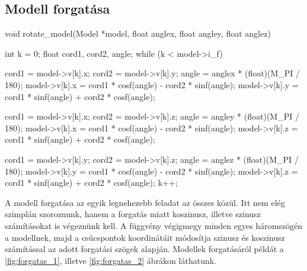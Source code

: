 	



\newpage
\subsection{Modell forgatása}

\begin{cpp}
void rotate_model(Model *model, float anglex, float angley, float anglez)
{
    int k = 0;
    float cord1, cord2, angle;
    while (k < model->i_f)
    {
        cord1 = model->v[k].x;
        cord2 = model->v[k].y;
        angle = anglex * (float)(M_PI / 180);
        model->v[k].x = cord1 * cosf(angle) - cord2 * sinf(angle);
        model->v[k].y = cord1 * sinf(angle) + cord2 * cosf(angle);
			
        cord1 = model->v[k].x;
        cord2 = model->v[k].z;
        angle = angley * (float)(M_PI / 180);
        model->v[k].x = cord1 * cosf(angle) - cord2 * sinf(angle);
        model->v[k].z = cord1 * sinf(angle) + cord2 * cosf(angle);
			
        cord1 = model->v[k].y;
        cord2 = model->v[k].z;
        angle = anglez * (float)(M_PI / 180);
        model->v[k].y = cord1 * cosf(angle) - cord2 * sinf(angle);
        model->v[k].z = cord1 * sinf(angle) + cord2 * cosf(angle);
        k++;
    }
}
\end{cpp}

A modell forgatása az egyik legnehezebb feladat az összes közül. Itt nem elég szimplán szoroznunk, hanem a forgatás miatt koszinusz, illetve szinusz számításokat is végeznünk kell. A függvény végigmegy minden egyes háromszögén a modellnek, majd a csúcspontok koordinátáit módosítja szinusz és koszinusz számítással az adott forgatási szögek alapján. Modellek forgatásáról példát a \ref{fig:forgatas_1}, illetve \ref{fig:forgatas_2} ábrákon láthatunk.

\newpage

